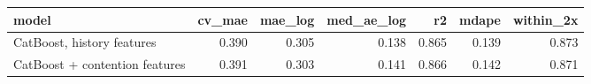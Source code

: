 \begin{tabular}{lrrrrrr}
\toprule
model & cv_mae & mae_log & med_ae_log & r2 & mdape & within_2x \\
\midrule
CatBoost, history features & 0.390 & 0.305 & 0.138 & 0.865 & 0.139 & 0.873 \\
CatBoost + contention features & 0.391 & 0.303 & 0.141 & 0.866 & 0.142 & 0.871 \\
\bottomrule
\end{tabular}
